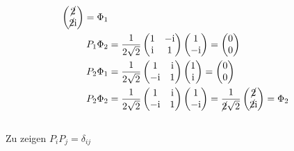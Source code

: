 \begin{align*}
\begin{pmatrix}
        \cancel{2} \\ \cancel{2} \mathrm i
    \end{pmatrix} 
    = \Phi_1 \\ 
    P_1\Phi_2 &= \frac 1{2\sqrt 2}
    \begin{pmatrix}
        1 & -\mathrm i \\
        \mathrm i & 1
    \end{pmatrix} \begin{pmatrix}
        1 \\ -\mathrm i 
    \end{pmatrix}
    = \begin{pmatrix}
        0 \\ 0
    \end{pmatrix} \\
    P_2\Phi_1 &= \frac 1{2\sqrt 2}
    \begin{pmatrix}
        1 & \mathrm i \\
        -\mathrm i & 1
    \end{pmatrix} \begin{pmatrix}
        1 \\ \mathrm i 
    \end{pmatrix}
    = \begin{pmatrix}
        0 \\ 0
    \end{pmatrix} \\
    P_2\Phi_2 &= \frac 1{2\sqrt 2}
    \begin{pmatrix}
        1 & \mathrm i \\
        -\mathrm i & 1
    \end{pmatrix} \begin{pmatrix}
        1 \\ -\mathrm i 
    \end{pmatrix}
    = \frac 1{\cancel{2}\sqrt 2}\begin{pmatrix}
        \cancel{2} \\ \cancel{2} \mathrm i
    \end{pmatrix} 
    =\Phi_2\\ 
\end{align*}

\subsection{}
Zu zeigen $P_iP_j = \delta_{ij}$


